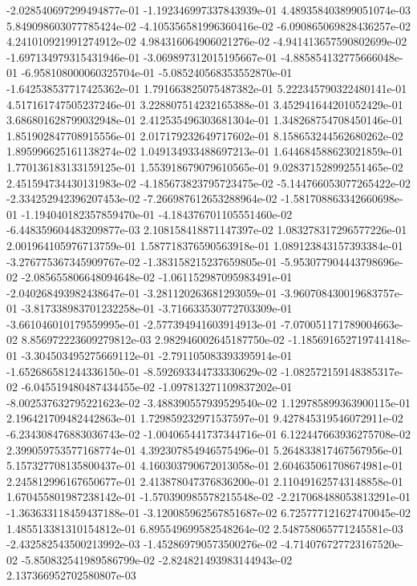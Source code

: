 -2.028540697299494877e-01
-1.192346997337843939e-01
4.489358403899051074e-03
5.849098603077785424e-02
-4.105356581996360416e-02
-6.090865069828436257e-02
4.241010921991274912e-02
4.984316064906021276e-02
-4.941413657590802699e-02
-1.697134979315431946e-01
-3.069897312015195667e-01
-4.885854132775666048e-01
-6.958108000060325704e-01
-5.085240568353552870e-01
-1.642538537717425362e-01
1.791663825075487382e-01
5.222345790322480141e-01
4.517161747505237246e-01
3.228807514232165388e-01
3.452941644201052429e-01
3.686801628799032948e-01
2.412535496303681304e-01
1.348268754708450146e-01
1.851902847708915556e-01
2.017179232649717602e-01
8.158653244562680262e-02
1.895996625161138274e-02
1.049134933488697213e-01
1.644684588623021859e-01
1.770136183133159125e-01
1.553918679079610565e-01
9.028371528992551465e-02
2.451594734430131983e-02
-4.185673823795723475e-02
-5.144766053077265422e-02
-2.334252942396207453e-02
-7.266987612653288964e-02
-1.581708863342660698e-01
-1.194040182357859470e-01
-4.184376701105551460e-02
-6.448359604483209877e-03
2.108158418871147397e-02
1.083278317296577226e-01
2.001964105976713759e-01
1.587718376590563918e-01
1.089123843157393384e-01
-3.276775367345909767e-02
-1.383158215237659805e-01
-5.953077904443798696e-02
-2.085655806648094648e-02
-1.061152987095983491e-01
-2.040268493982438647e-01
-3.281120263681293059e-01
-3.960708430019683757e-01
-3.817338983701232258e-01
-3.716633530772703309e-01
-3.661046010179559995e-01
-2.577394941603914913e-01
-7.070051171789004663e-02
8.856972223609279812e-03
2.982946002645187750e-02
-1.185691652719741418e-01
-3.304503495275669112e-01
-2.791105083393395914e-01
-1.652686581244336150e-01
-8.592693344733330629e-02
-1.082572159148385317e-02
-6.045519480487434455e-02
-1.097813271109837202e-01
-8.002537632795221623e-02
-3.488390557939529540e-02
1.129785899363900115e-01
2.196421709482442863e-01
1.729859232971537597e-01
9.427845319546072911e-02
-6.234308476883036743e-02
-1.004065441737344716e-01
6.122447663936275708e-02
2.399059753577168774e-01
4.392307854946575496e-01
5.264833817467567956e-01
5.157327708135800437e-01
4.160303790672013058e-01
2.604635061708674981e-01
2.245812996167650677e-01
2.413878047376836200e-01
2.110491625743148858e-01
1.670455801987238142e-01
-1.570390985578215548e-02
-2.217068488053813291e-01
-1.363633118459437188e-01
-3.120085962567851687e-02
6.725777121627470045e-02
1.485513381310154812e-01
6.895549699582548264e-02
2.548758065771245581e-03
-2.432582543500213992e-03
-1.452869790573500276e-02
-4.714076727723167520e-02
-5.850832541989586799e-02
-2.824821493983144943e-02
2.137366952702580807e-03
